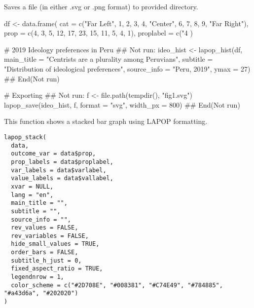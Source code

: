 \documentclass[a4paper]{book}
\begin{document}
%
\begin{Value}
Saves a file (in either .svg or .png format) to provided directory.
\end{Value}
%
\begin{Examples}
\begin{ExampleCode}
df <- data.frame(
cat = c("Far Left", 1, 2, 3, 4, "Center", 6, 7, 8, 9, "Far Right"),
prop = c(4, 3, 5, 12, 17, 23, 15, 11, 5, 4, 1),
proplabel = c("4%
)

# 2019 Ideology preferences in Peru
## Not run: 
ideo_hist <- lapop_hist(df,
          main_title = "Centrists are a plurality among Peruvians",
          subtitle = "Distribution of ideological preferences",
          source_info = "Peru, 2019",
          ymax = 27)
## End(Not run)

# Exporting
## Not run: 
f <- file.path(tempdir(), "fig1.svg")
lapop_save(ideo_hist, f, format = "svg", width_px = 800)
## End(Not run)
\end{ExampleCode}
\end{Examples}
%
\begin{Description}
This function shows a stacked bar graph using LAPOP formatting.
\end{Description}
%
\begin{Usage}
\begin{verbatim}
lapop_stack(
  data,
  outcome_var = data$prop,
  prop_labels = data$proplabel,
  var_labels = data$varlabel,
  value_labels = data$vallabel,
  xvar = NULL,
  lang = "en",
  main_title = "",
  subtitle = "",
  source_info = "",
  rev_values = FALSE,
  rev_variables = FALSE,
  hide_small_values = TRUE,
  order_bars = FALSE,
  subtitle_h_just = 0,
  fixed_aspect_ratio = TRUE,
  legendnrow = 1,
  color_scheme = c("#2D708E", "#008381", "#C74E49", "#784885", "#a43d6a", "#202020")
)
\end{verbatim}
\end{Usage}
%
\end{document}
